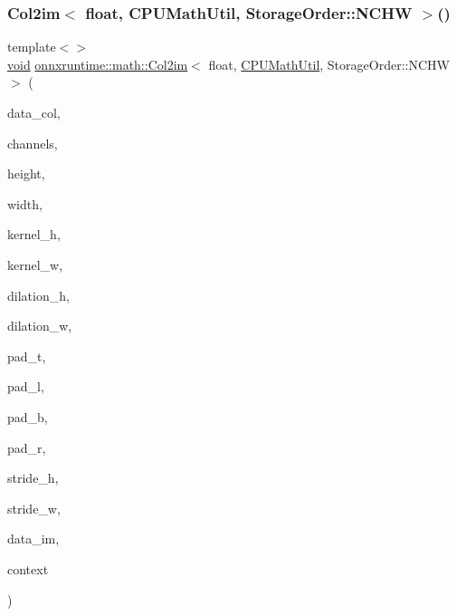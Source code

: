 \mbox{\label{namespaceonnxruntime_1_1math_a81f54d326919afb1852b762199b22e3d}} 
\subsubsection{\texorpdfstring{Col2im$<$ float, C\+P\+U\+Math\+Util, Storage\+Order\+::\+N\+C\+H\+W $>$()}{Col2im< float, CPUMathUtil, StorageOrder::NCHW >()}}
{\footnotesize\ttfamily template$<$$>$ \\
\mbox{\hyperlink{mlasi_8h_a88f941d423cb2a819b70a1358982b1a6}{void}} \mbox{\hyperlink{namespaceonnxruntime_1_1math_a2146d8b8e4933d93cb0934db0ed984a1}{onnxruntime\+::math\+::\+Col2im}}$<$ float, \mbox{\hyperlink{classonnxruntime_1_1CPUMathUtil}{C\+P\+U\+Math\+Util}}, Storage\+Order\+::\+N\+C\+HW $>$ (\begin{DoxyParamCaption}\item[{const float $\ast$}]{data\+\_\+col,  }\item[{const int64\+\_\+t}]{channels,  }\item[{const int64\+\_\+t}]{height,  }\item[{const int64\+\_\+t}]{width,  }\item[{const int64\+\_\+t}]{kernel\+\_\+h,  }\item[{const int64\+\_\+t}]{kernel\+\_\+w,  }\item[{const int64\+\_\+t}]{dilation\+\_\+h,  }\item[{const int64\+\_\+t}]{dilation\+\_\+w,  }\item[{const int64\+\_\+t}]{pad\+\_\+t,  }\item[{const int64\+\_\+t}]{pad\+\_\+l,  }\item[{const int64\+\_\+t}]{pad\+\_\+b,  }\item[{const int64\+\_\+t}]{pad\+\_\+r,  }\item[{const int64\+\_\+t}]{stride\+\_\+h,  }\item[{const int64\+\_\+t}]{stride\+\_\+w,  }\item[{float $\ast$}]{data\+\_\+im,  }\item[{\mbox{\hyperlink{classonnxruntime_1_1CPUMathUtil}{C\+P\+U\+Math\+Util}} $\ast$}]{context }\end{DoxyParamCaption})}

